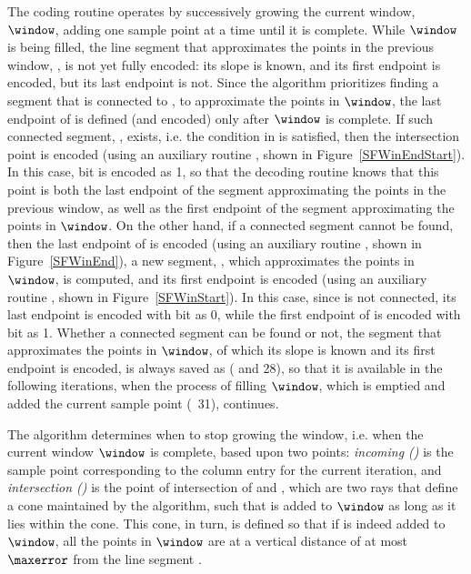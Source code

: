 \vspace{-3pt}
The coding routine operates by successively growing the current window, $\window$, adding one sample point at a time until it is complete. While $\window$ is being filled, the line segment that approximates the points in the previous window, \segmentLastT, is not yet fully encoded: its slope is known, and its first endpoint is encoded, but its last endpoint is not. Since the algorithm prioritizes finding a segment that is connected to \segmentLastT, to approximate the points in $\window$, the last endpoint of \segmentLastT is defined (and encoded) only after $\window$ is complete. If such connected segment, \segmentConnT, exists, i.e. the condition in  is satisfied, then the intersection point is encoded (using an auxiliary routine \SFEncodeWinEndStart, shown in Figure~\ref{SFWinEndStart}). In this case, bit \connectedS is encoded as 1, so that the decoding routine knows that this point is both the last endpoint of the segment approximating the points in the previous window, as well as the first endpoint of the segment approximating the points in $\window$. On the other hand, if a connected segment cannot be found, then the last endpoint of \segmentLastT is encoded (using an auxiliary routine \SFWinEndP, shown in Figure~\ref{SFWinEnd}), a new segment, \segmentS, which approximates the points in $\window$, is computed, and its first endpoint is encoded (using an auxiliary routine \SFEncodeWinEndStart, shown in Figure~\ref{SFWinStart}). In this case, since \segmentLastT is not connected, its last endpoint is encoded with bit \connectedS as 0, while the first endpoint of \segmentS is encoded with bit \connectedS as 1. Whether a connected segment can be found or not, the segment that approximates the points in $\window$, of which its slope is known and its first endpoint is encoded, is always saved as \segmentLastT ( and 28), so that it is available in the following iterations, when the process of filling $\window$, which is emptied and added the current sample point (\Line~31), continues.


\vspace{-2pt}


\clearpage




\vspace{-5pt}



The algorithm determines when to stop growing the window, i.e. when the current window $\window$ is complete, based upon two points: \textit{incoming (\incoming)} is the sample point corresponding to the column entry for the current iteration, and \textit{intersection (\intersection)} is the point of intersection of \smin and \smax, which are two rays that define a cone maintained by the algorithm, such that \incoming is added to $\window$ as long as it lies within the cone. This cone, in turn, is defined so that if \incoming is indeed added to $\window$, all the points in $\window$ are at a vertical distance of at most $\maxerror$ from the line segment \interSegmentSF.


